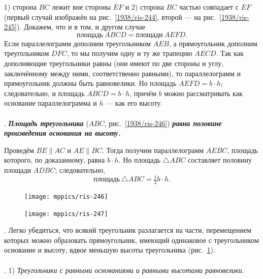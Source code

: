 \documentclass[oneside]{book}
\begin{document}
1) сторона $BC$ лежит вне стороны $EF$ и 2) сторона $BC$ частью совпадает с $EF$ (первый случай изображён на рис.~\ref{1938/ris-244}, второй — на рис.~\ref{1938/ris-245}).
Докажем, что и в том, и другом случае
\[\text{площадь}~ABCD = \text{площади}~AEFD.\]
Если параллелограмм дополним треугольником $AEB$, а прямоугольник дополним треугольником $DFC$, то мы получим одну и ту же трапецию $AECD$.
Так как дополняющие треугольники равны (они имеют по две стороны и углу, заключённому между ними, соответственно равными), то параллелограмм и прямоугольник должны быть равновелики.
Но площадь $AEFD=b\cdot h$;
следовательно, и площадь $ABCD=b\cdot h$, причём $b$ можно рассматривать как основание параллелограмма и $h$ — как его высоту.


\paragraph{}\label{1938/248}
.
\textbf{\emph{Площадь треугольника}} ($ABC$, рис.~\ref{1938/ris-246}) \textbf{\emph{равна половине произведения основания на высоту.}}

Проведём $BE \parallel  AC$ и $AE \parallel BC$.
Тогда получим параллелограмм $AEBC$, площадь которого, по доказанному, равна $b\cdot h$.
Но площадь $\triangle ABC$ составляет половину площади $ADBC$;
следовательно,
\[\text{площадь}~ \triangle ABC=\tfrac12b\cdot h.\]

\begin{figure}[h]
\begin{minipage}{.48\textwidth}
\centering
\texttt{[image: mppics/ris-246]}
\caption{}\label{1938/ris-246}
\end{minipage}
\hfill
\begin{minipage}{.48\textwidth}
\centering
\texttt{[image: mppics/ris-247]}
\caption{}\label{1938/ris-247}
\end{minipage}
\end{figure}

\mbox{.}
Легко убедиться, что всякий треугольник разлагается на части, перемещением которых можно образовать прямоугольник, имеющий одинаковое с треугольником основание и высоту, вдвое меньшую высоты треугольника (рис.~\ref{1938/ris-247}).

\paragraph{}\label{1938/249}
.
1) \emph{Треугольники с равными основаниями и равными высотами равновелики.}
\end{document}
